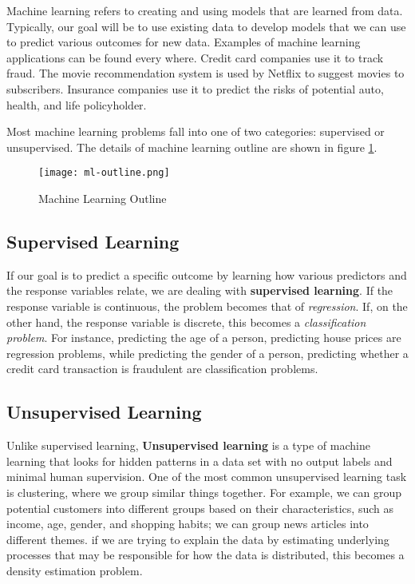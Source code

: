 Machine learning refers to creating and using models that are learned from data.
Typically, our goal will be to use existing data to develop models that we can
use to predict various outcomes for new data. Examples of machine learning
applications can be found every where. Credit card companies use it to track
fraud.  The movie recommendation system is used by Netflix to suggest movies to
subscribers. Insurance companies use it to predict the risks of potential auto,
health, and life policyholder.

Most machine learning problems fall into one of two categories: supervised or
unsupervised. The details of machine learning outline are shown in figure
\ref{fig:ml-outline}.

\begin{figure}[H]\centering
    \texttt{[image: ml-outline.png]}
    \caption{Machine Learning Outline}
    \label{fig:ml-outline}
\end{figure}

\subsection{Supervised Learning}

If our goal is to predict a specific outcome by learning how various predictors
and the response variables relate, we are dealing with \textbf{supervised
learning}. If the response variable is continuous, the problem becomes that of
\textit{regression}. If, on the other hand, the response variable is discrete,
this becomes a \textit{classification problem}. For instance, predicting the age
of a person, predicting house prices are regression problems, while predicting
the gender of a person, predicting whether a credit card transaction is
fraudulent are classification problems.

\subsection{Unsupervised Learning}
Unlike supervised learning, \textbf{Unsupervised learning} is a type of machine
learning that looks for hidden patterns in a data set with no output labels and
minimal human supervision. One of the most common unsupervised learning task is
clustering, where we group similar things together. For example, we can group
potential customers into different groups based on their characteristics, such
as income, age, gender, and shopping habits; we can group news articles into
different themes. if we are trying to explain the data by estimating underlying
processes that may be responsible for how the data is distributed, this becomes
a density estimation problem.

